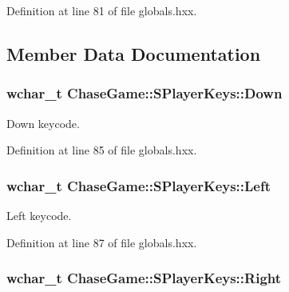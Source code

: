 Definition at line 81 of file globals.\-hxx.



\subsection{Member Data Documentation}
\hypertarget{struct_chase_game_1_1_s_player_keys_abe56af951c133c98b24401542f28ec9b}{
\subsubsection[{Down}]{\setlength{\rightskip}{0pt plus 5cm}wchar\-\_\-t Chase\-Game\-::\-S\-Player\-Keys\-::\-Down}}\label{struct_chase_game_1_1_s_player_keys_abe56af951c133c98b24401542f28ec9b}


Down keycode. 



Definition at line 85 of file globals.\-hxx.

\hypertarget{struct_chase_game_1_1_s_player_keys_ab6c4f7e03fa43cd9443dcbd16a5e3250}{
\subsubsection[{Left}]{\setlength{\rightskip}{0pt plus 5cm}wchar\-\_\-t Chase\-Game\-::\-S\-Player\-Keys\-::\-Left}}\label{struct_chase_game_1_1_s_player_keys_ab6c4f7e03fa43cd9443dcbd16a5e3250}


Left keycode. 



Definition at line 87 of file globals.\-hxx.

\hypertarget{struct_chase_game_1_1_s_player_keys_a17ec0fea68ec78ad4577c6b56b83fa15}{
\subsubsection[{Right}]{\setlength{\rightskip}{0pt plus 5cm}wchar\-\_\-t Chase\-Game\-::\-S\-Player\-Keys\-::\-Right}}\label{struct_chase_game_1_1_s_player_keys_a17ec0fea68ec78ad4577c6b56b83fa15}


